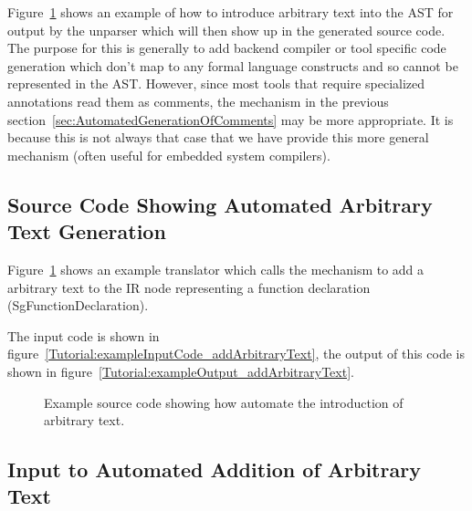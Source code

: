    Figure~\ref{Tutorial:example_addArbitraryText} shows an example of 
how to introduce arbitrary text into the AST for output by the unparser 
which will then show up in the generated source code. The purpose for 
this is generally to add backend compiler or tool specific code 
generation which don't map to any formal language constructs and so 
cannot be represented in the AST.  However, since most tools that
require specialized annotations read them as comments, the mechanism
in the previous section~\ref{sec:AutomatedGenerationOfComments} may be more appropriate. It is 
because this is not always that case that we have provide this more 
general mechanism (often useful for embedded system compilers).

\subsection{Source Code Showing Automated Arbitrary Text Generation}

    Figure~\ref{Tutorial:example_addArbitraryText}
shows an example translator which calls the mechanism to 
add a arbitrary text to the IR node representing a function 
declaration (SgFunctionDeclaration).

The input code is shown in figure~\ref{Tutorial:exampleInputCode_addArbitraryText},
the output of this code is shown in 
figure~\ref{Tutorial:exampleOutput_addArbitraryText}.

\begin{figure}[!h]
{\indent
{\mySmallFontSize

\begin{latexonly}
   
\end{latexonly}

\begin{htmlonly}
   
\end{htmlonly}

}
}
\caption{Example source code showing how automate the introduction of arbitrary text. }
\label{Tutorial:example_addArbitraryText}
\end{figure}


\subsection{Input to Automated Addition of Arbitrary Text}

